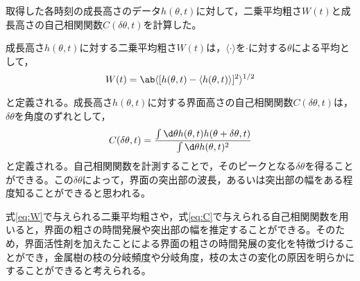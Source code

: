 \documentclass[autodetect-engine,dvi=dvipdfmx,a4paper,ja=standard,oneside,openany,11pt]{bxjsbook}
\begin{document}
取得した各時刻の成長高さのデータ$h(\theta,t)$に対して，二乗平均粗さ$W(t)$と成長高さの自己相関関数$C(\delta\theta,t)$を計算した。

成長高さ$h(\theta,t)$に対する二乗平均粗さ$W(t)$は，$\langle\cdot\rangle$を$\cdot$に対する$\theta$による平均として，
\begin{equation}
  W(t) = \ab\langle[h(\theta,t)-\langle h(\theta,t)\rangle]^2\rangle^{1/2}
  \label{eq:W}
\end{equation}

と定義される。成長高さ$h(\theta,t)$に対する界面高さの自己相関関数$C(\delta\theta,t)$は，$\delta \theta$を角度のずれとして，
\begin{equation}
  C(\delta\theta,t) = \frac{\int \d \theta h(\theta,t)h(\theta+\delta\theta,t)}{\int \d \theta h(\theta,t)^2}
  \label{eq:C}
\end{equation}
と定義される。自己相関関数を計測することで，そのピークとなる$\delta \theta$を得ることができる。この$\delta \theta$によって，界面の突出部の波長，あるいは突出部の幅をある程度知ることができると思われる。

式\eqref{eq:W}で与えられる二乗平均粗さや，式\eqref{eq:C}で与えられる自己相関関数を用いると，界面の粗さの時間発展や突出部の幅を推定することができる。そのため，界面活性剤を加えたことによる界面の粗さの時間発展の変化を特徴づけることができ，金属樹の枝の分岐頻度や分岐角度，枝の太さの変化の原因を明らかにすることができると考えられる。
\ifdraft{
  
  
}{}
\end{document}

